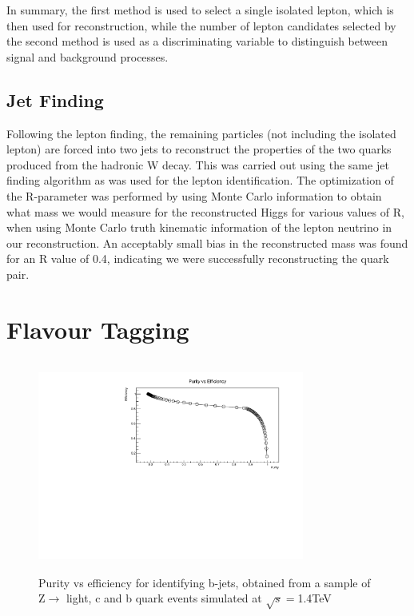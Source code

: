 In summary, the first method is used to select a single isolated lepton, which is then used for reconstruction, while the number of lepton candidates selected by the second method is used as a discriminating variable to distinguish between signal and background processes. 

\subsection{Jet Finding}

Following the lepton finding, the remaining particles (not including the isolated lepton) are forced into two jets to reconstruct the properties of the two quarks produced from the hadronic W decay. This was carried out using the same jet finding algorithm as was used for the lepton identification. The optimization of the R-parameter was performed by using Monte Carlo information to obtain what mass we would measure for the reconstructed Higgs for various values of R, when using Monte Carlo truth kinematic information of the lepton neutrino in our reconstruction. An acceptably small bias in the reconstructed mass was found for an R value of 0.4, indicating we were successfully reconstructing the quark pair.

\section{Flavour Tagging}

\begin{figure}[b]
  \centering
  \includegraphics[width=0.78\textwidth,height=7cm,keepaspectratio]{HiggsAnalysis/figures/btag_crosses}
  \caption[B-Tagging Purity vs Efficiency]{Purity vs efficiency for identifying b-jets, obtained from a sample of Z$\rightarrow$ light, c and b quark events simulated at $\sqrt{s}=$1.4TeV}
  \label{btag}
\end{figure}

